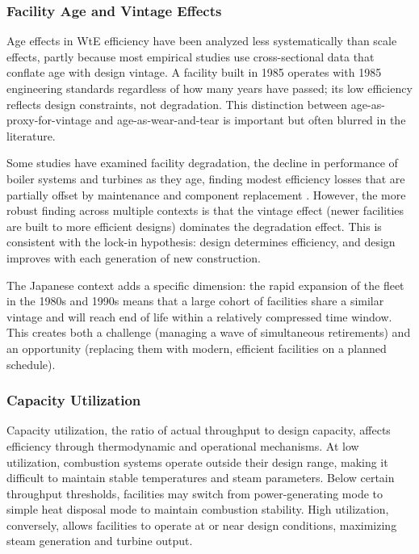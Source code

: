 \documentclass[12pt,a4paper]{article}
\begin{document}
\subsubsection{Facility Age and Vintage Effects}

Age effects in WtE efficiency have been analyzed less systematically than scale effects, partly because most empirical studies use cross-sectional data that conflate age with design vintage. A facility built in 1985 operates with 1985 engineering standards regardless of how many years have passed; its low efficiency reflects design constraints, not degradation. This distinction between age-as-proxy-for-vintage and age-as-wear-and-tear is important but often blurred in the literature.

Some studies have examined facility degradation, the decline in performance of boiler systems and turbines as they age, finding modest efficiency losses that are partially offset by maintenance and component replacement \citep{Astrup2015}. However, the more robust finding across multiple contexts is that the vintage effect (newer facilities are built to more efficient designs) dominates the degradation effect. This is consistent with the lock-in hypothesis: design determines efficiency, and design improves with each generation of new construction.

The Japanese context adds a specific dimension: the rapid expansion of the fleet in the 1980s and 1990s means that a large cohort of facilities share a similar vintage and will reach end of life within a relatively compressed time window. This creates both a challenge (managing a wave of simultaneous retirements) and an opportunity (replacing them with modern, efficient facilities on a planned schedule).

\subsubsection{Capacity Utilization}

Capacity utilization, the ratio of actual throughput to design capacity, affects efficiency through thermodynamic and operational mechanisms. At low utilization, combustion systems operate outside their design range, making it difficult to maintain stable temperatures and steam parameters. Below certain throughput thresholds, facilities may switch from power-generating mode to simple heat disposal mode to maintain combustion stability. High utilization, conversely, allows facilities to operate at or near design conditions, maximizing steam generation and turbine output.
\end{document}
